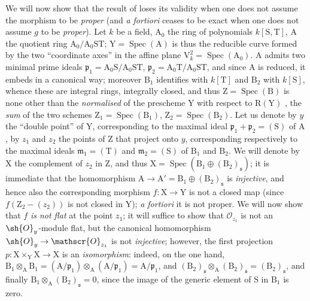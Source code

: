 \begin{env}[11.7.2]
\label{IV.11.7.2}
We will now show that the result of  loses its validity when one does not assume the morphism to be \emph{proper} (and \emph{a fortiori}  ceases to be exact when one does not assume $g$ to be \emph{proper}).
Let $k$ be a field, $\mathrm{A}_0$ the ring of polynomials $k[\mathrm{S},\mathrm{T}]$, $\mathrm{A}$ the quotient ring $\mathrm{A}_0/\mathrm{A}_0\mathrm{S}\mathrm{T}$; $\mathrm{Y}=\operatorname{Spec}(\mathrm{A})$ is thus the reducible curve formed by the two ``coordinate axes'' in the affine plane $\mathrm{V}_k^2=\operatorname{Spec}(\mathrm{A}_0)$.
$\mathrm{A}$ admits two minimal prime ideals $\mathfrak{p}_1=\mathrm{A}_0\mathrm{S}/\mathrm{A}_0\mathrm{S}\mathrm{T}$, $\mathfrak{p}_2=\mathrm{A}_0\mathrm{T}/\mathrm{A}_0\mathrm{S}\mathrm{T}$, and since $\mathrm{A}$ is reduced, it embeds in a canonical way; moreover $\mathrm{B}_1$ identifies with $k[\mathrm{T}]$ and $\mathrm{B}_2$ with $k[\mathrm{S}]$, whence these are integral rings, integrally closed, and thus $\mathrm{Z}=\operatorname{Spec}(\mathrm{B})$ is none other than the \emph{normalised} of the prescheme $\mathrm{Y}$ with respect to $\mathrm{R}(\mathrm{Y})$ , the \emph{sum} of the two schemes $\mathrm{Z}_1=\operatorname{Spec}(\mathrm{B}_1)$, $\mathrm{Z}_2=\operatorname{Spec}(\mathrm{B}_2)$.
Let us denote by $y$ the ``double point'' of $\mathrm{Y}$, corresponding to the maximal ideal $\mathfrak{p}_1+\mathfrak{p}_2=(\mathrm{S})$ of $\mathrm{A}$, by $z_1$ and $z_2$ the points of $\mathrm{Z}$ that project onto $y$, corresponding respectively to the maximal ideals $\mathfrak{m}_1=(\mathrm{T})$ and $\mathfrak{m}_2=(\mathrm{S})$ of $\mathrm{B}_1$ and $\mathrm{B}_2$.
We will denote by $\mathrm{X}$ the complement of $z_2$ in $\mathrm{Z}$, and thus $\mathrm{X}=\operatorname{Spec}(\mathrm{B}_1\oplus(\mathrm{B}_2)_\mathfrak{s})$; it is immediate that the homomorphism $\mathrm{A}\to\mathrm{A}'=\mathrm{B}_1\oplus(\mathrm{B}_2)_\mathfrak{s}$ is \emph{injective}, and hence also the corresponding morphism $f:\mathrm{X}\to\mathrm{Y}$ is not a closed map (since $f(\mathrm{Z}_2-(z_2))$ is not closed in $\mathrm{Y}$); \emph{a fortiori} it is not proper.
We will now show that $f$ \emph{is not flat} at the point $z_1$; it will suffice to show  that $\mathscr{O}_{z_1}$ is not an $\sh{O}_y$-module flat, but the canonical homomorphism $\sh{O}_y\to\mathscr{O}_{z_1}$ is not \emph{injective}; however, the first projection $p:\mathrm{X}\times_\mathrm{Y}\mathrm{X}\to\mathrm{X}$ is an \emph{isomorphism}: indeed, on the one hand, $\mathrm{B}_1\otimes_\mathrm{A}\mathrm{B}_1=(\mathrm{A}/\mathfrak{p}_1)\otimes_\mathrm{A}(\mathrm{A}/\mathfrak{p}_1)=\mathrm{A}/\mathfrak{p}_1$, and $(\mathrm{B}_2)_\mathfrak{s}\otimes_\mathrm{A}(\mathrm{B}_2)_\mathfrak{s}=(\mathrm{B}_2)_\mathfrak{s}$, and finally $\mathrm{B}_1\otimes_\mathrm{A}(\mathrm{B}_2)_\mathfrak{s}=0$, since the image of the generic element of $\mathrm{S}$ in $\mathrm{B}_1$ is zero.
\end{env}

